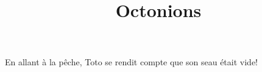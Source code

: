 \documentclass{article}
\title{Octonions}
\begin{document}
En allant à la pêche, Toto se rendit compte que son seau était vide!
\end{document}
